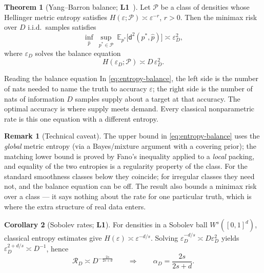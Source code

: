 \documentclass[11pt,a4paper]{article}
\theoremstyle{definition}
\newtheorem{theorem}{Theorem}[section]
\newtheorem{corollary}[theorem]{Corollary}
\newtheorem{remark}{Remark}[section]
\begin{document}
\begin{theorem}[Yang--Barron balance; \textbf{L1}~\cite{yang1999information,tsybakov2009introduction}]
Let $\mathcal{P}$ be a class of densities whose Hellinger metric entropy satisfies $H(\varepsilon;\mathcal{P}) \asymp \varepsilon^{-r}$, $r>0$. Then the minimax risk over $D$ i.i.d.\ samples satisfies
\begin{equation}
  \inf_{\hat p}\ \sup_{p^*\in\mathcal{P}}\ \mathbb{E}_{p^*}\big[\mathsf{d}^2(p^*,\hat p)\big] \asymp \varepsilon_D^2,
\end{equation}
where $\varepsilon_D$ solves the balance equation
\begin{equation}
  \boxed{H(\varepsilon_D;\mathcal{P}) \asymp D\,\varepsilon_D^2}.
  \label{eq:entropy-balance}
\end{equation}
\end{theorem}

\begin{intuition}{Reading the balance equation}
In \eqref{eq:entropy-balance}, the left side is the number of nats needed to name the truth to accuracy $\varepsilon$; the right side is the number of nats of information $D$ samples supply about a target at that accuracy. The optimal accuracy is where supply meets demand. Every classical nonparametric rate is this one equation with a different entropy.
\end{intuition}

\begin{remark}[Technical caveat]
The upper bound in \eqref{eq:entropy-balance} uses the \emph{global} metric entropy (via a Bayes/mixture argument with a covering prior); the matching lower bound is proved by Fano's inequality applied to a \emph{local} packing, and equality of the two entropies is a regularity property of the class. For the standard smoothness classes below they coincide; for irregular classes they need not, and the balance equation can be off. The result also bounds a minimax risk over a class --- it says nothing about the rate for one particular truth, which is where the extra structure of real data enters.
\end{remark}

\begin{corollary}[Sobolev rates; \textbf{L1}]
For densities in a Sobolev ball $W^s([0,1]^d)$, classical entropy estimates give $H(\varepsilon)\asymp \varepsilon^{-d/s}$. Solving $\varepsilon_D^{-d/s}\asymp D\varepsilon_D^2$ yields $\varepsilon_D^{2+d/s}\asymp D^{-1}$, hence
\begin{equation}
  \mathcal{R}_D \asymp D^{-\frac{2s}{2s+d}}
  \qquad\Longrightarrow\qquad
  \alpha_D = \frac{2s}{2s+d}.
\end{equation}
\end{corollary}
\end{document}
